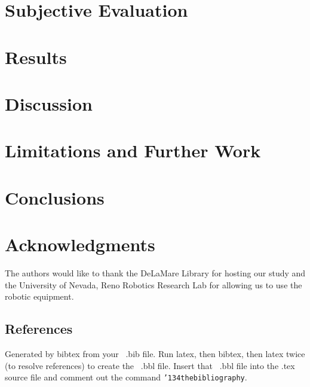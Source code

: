 \documentclass{acm_proc_article-sp}
\begin{document}
\section{Subjective Evaluation}
\section{Results}
\section{Discussion}
\section{Limitations and Further Work}
\section{Conclusions}


\section{Acknowledgments}
The authors would like to thank the DeLaMare Library for hosting our study and the University of Nevada, Reno Robotics Research Lab for allowing us to use the robotic equipment.

%

%
%
\subsection{References}
Generated by bibtex from your ~.bib file.  Run latex,
then bibtex, then latex twice (to resolve references)
to create the ~.bbl file.  Insert that ~.bbl file into
the .tex source file and comment out
the command \texttt{{\char'134}thebibliography}.
\balancecolumns
\end{document}
